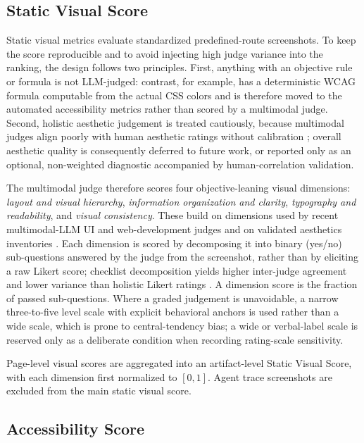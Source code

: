 \subsection{Static Visual Score}

Static visual metrics evaluate standardized predefined-route screenshots. To
keep the score reproducible and to avoid injecting high judge variance into the
ranking, the design follows two principles. First, anything with an objective
rule or formula is not LLM-judged: contrast, for example, has a deterministic
\mbox{WCAG} formula computable from the actual CSS colors and is therefore moved
to the automated accessibility metrics rather than scored by a multimodal judge.
Second, holistic aesthetic judgement is treated cautiously, because multimodal
judges align poorly with human aesthetic ratings without calibration
\cite{visawi,lavie2004aesthetics}; overall aesthetic quality is consequently
deferred to future work, or reported only as an optional, non-weighted
diagnostic accompanied by human-correlation validation.

The multimodal judge therefore scores four objective-leaning visual dimensions:
\emph{layout and visual hierarchy}, \emph{information organization and clarity},
\emph{typography and readability}, and \emph{visual consistency}. These build on
dimensions used by recent multimodal-LLM UI and web-development judges
\cite{mllmuijudge,webdevjudge} and on validated aesthetics inventories
\cite{visawi,lavie2004aesthetics}. Each dimension is scored by decomposing it
into binary (yes/no) sub-questions answered by the judge from the screenshot,
rather than by eliciting a raw Likert score; checklist decomposition yields
higher inter-judge agreement and lower variance than holistic Likert ratings
\cite{checkeval}. A dimension score is the fraction of passed sub-questions.
Where a graded judgement is unavoidable, a narrow three-to-five level scale with
explicit behavioral anchors is used rather than a wide scale, which is prone to
central-tendency bias; a wide or verbal-label scale is reserved only as a
deliberate condition when recording rating-scale sensitivity.

Page-level visual scores are aggregated into an artifact-level Static Visual
Score, with each dimension first normalized to $[0,1]$. Agent trace screenshots
are excluded from the main static visual score.

\subsection{Accessibility Score}

